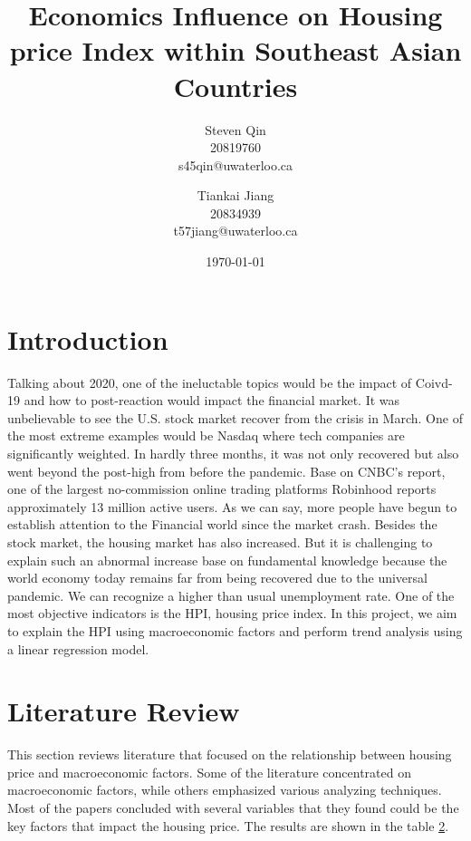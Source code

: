 \documentclass[11pt]{article}
\title{Economics Influence on Housing price Index within Southeast Asian Countries}
\author{Steven Qin\\20819760\\s45qin@uwaterloo.ca \and Tiankai Jiang\\20834939\\t57jiang@uwaterloo.ca}
\date{\today}
\begin{document}
\maketitle

\section{Introduction}\label{introduction}
Talking about 2020, one of the ineluctable topics would be the impact of Coivd-19 and how to post-reaction would impact the financial market. It was unbelievable to see the U.S. stock market recover from the crisis in March. One of the most extreme examples would be Nasdaq where tech companies are significantly weighted. In hardly three months, it was not only recovered but also went beyond the post-high from before the pandemic. Base on CNBC's report, one of the largest no-commission online trading platforms Robinhood reports approximately 13 million active users. As we can say, more people have begun to establish attention to the Financial world since the market crash. Besides the stock market, the housing market has also increased. But it is challenging to explain such an abnormal increase base on fundamental knowledge because the world economy today remains far from being recovered due to the universal pandemic. We can recognize a higher than usual unemployment rate. One of the most objective indicators is the HPI, housing price index. In this project, we aim to explain the HPI using macroeconomic factors and perform trend analysis using a linear regression model. 

\section{Literature Review}\label{literature_review}
This section reviews literature that focused on the relationship between housing price and macroeconomic factors. Some of the literature concentrated on macroeconomic factors, while others emphasized various analyzing techniques. Most of the papers concluded with several variables that they found could be the key factors that impact the housing price. The results are shown in the table \ref{literature_review}.
\end{document}
